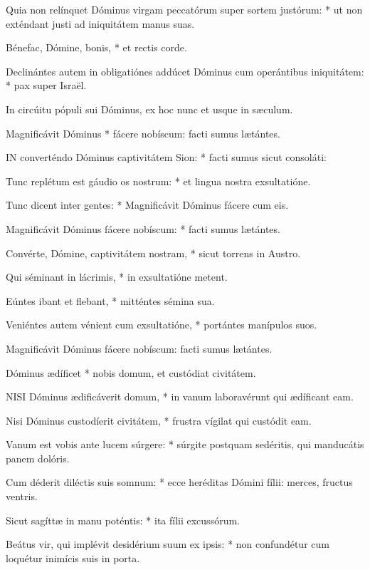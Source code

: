 Quia non relínquet Dóminus virgam peccatórum super sortem justórum: * ut non exténdant justi ad iniquitátem manus suas.

Bénefac, Dómine, bonis, * et rectis corde.

Declinántes autem in obligatiónes addúcet Dóminus cum operántibus iniquitátem: * pax super Israël.

 In circúitu pópuli sui Dóminus, ex hoc nunc et usque in sæculum.

 Magnificávit Dóminus * fácere nobíscum: facti sumus lætántes.


\lettrine[lines=2]{I}{N} converténdo Dóminus captivitátem Sion: * facti sumus sicut consoláti:

Tunc replétum est gáudio os nostrum: * et lingua nostra exsultatióne.

Tunc dicent inter gentes: * Magnificávit Dóminus fácere cum eis.

Magnificávit Dóminus fácere nobíscum: * facti sumus lætántes.

Convérte, Dómine, captivitátem nostram, * sicut torrens in Austro.

Qui séminant in lácrimis, * in exsultatióne metent.

Eúntes ibant et flebant, * mitténtes sémina sua.

Veniéntes autem vénient cum exsultatióne, * portántes manípulos suos.

 Magnificávit Dóminus fácere nobíscum: facti sumus lætántes.

 Dóminus ædíficet * nobis domum, et custódiat civitátem.


\lettrine[lines=2]{N}{ISI} Dóminus ædificáverit domum, * in vanum laboravérunt qui ædíficant eam.

Nisi Dóminus custodíerit civitátem, * frustra vígilat qui custódit eam.

Vanum est vobis ante lucem súrgere: * súrgite postquam sedéritis, qui manducátis panem dolóris.

Cum déderit diléctis suis somnum: * ecce heréditas Dómini fílii: merces, fructus ventris.

Sicut sagíttæ in manu poténtis: * ita fílii excussórum.

Beátus vir, qui implévit desidérium suum ex ipsis: * non confundétur cum loquétur inimícis suis in porta.

